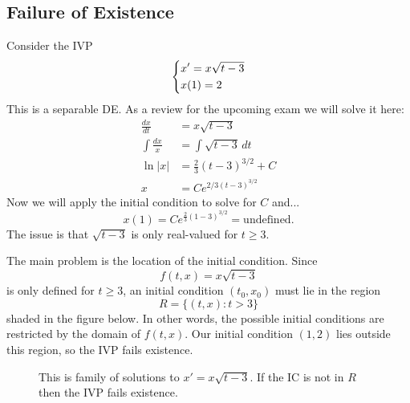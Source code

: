 \documentclass[11pt,letterpaper]{article}
\begin{document}
\subsection{Failure of Existence} Consider the IVP
$$
\begin{dcases}
    x' = x\sqrt{t-3}\\
    x(1)=2
\end{dcases}
$$
This is a separable DE. As a review for the upcoming exam we will solve it here:
\begin{align*}
    \frac{dx}{dt} &= x \sqrt{t-3}\\
    \int \frac{dx}{x} &=  \int\sqrt{t-3}\,dt\\
    \ln|x| &=  \frac{2}{3}(t-3)^{3/2} +C\\
    x & = Ce^{2/3 (t-3)^{3/2}}
\end{align*}
Now we will apply the initial condition to solve for $C$ and...
\[
x(1)
=
Ce^{\frac{2}{3}(1-3)^{3/2}}
=
\text{undefined}.
\]
The issue is that $\sqrt{t-3}$ is only real-valued for $t\geq 3$. 

The main problem is the location of the initial condition. Since 
\[
f(t,x)=x\sqrt{t-3}
\]
is only defined for $t\geq 3$, an initial condition $(t_0,x_0)$ must lie in the region
\[
R=\{(t,x):t> 3\}
\]
shaded in the figure below. In other words, the possible initial conditions
are restricted by the domain of $f(t,x)$. Our initial condition $(1,2)$ lies outside this region, so the IVP fails existence.
\begin{figure}[H]
    \centering
{}\caption{This is family of solutions to $x'=x\sqrt{t-3}$. If the IC is not in $R$ then the IVP fails existence.}
\end{figure}
\end{document}
